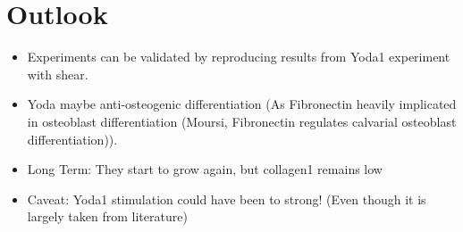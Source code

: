 \chapter{Outlook}

\begin{itemize}
    \item Experiments can be validated by reproducing results from Yoda1 experiment with shear.
    \item Yoda maybe anti-osteogenic differentiation (As Fibronectin heavily implicated in osteoblast differentiation (Moursi, Fibronectin regulates calvarial osteoblast differentiation)).
    \item Long Term: They start to grow again, but collagen1 remains low
    \item Caveat: Yoda1 stimulation could have been to strong! (Even though it is largely taken from literature)
\end{itemize}
